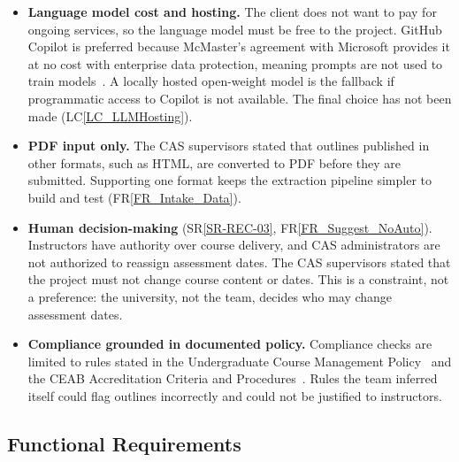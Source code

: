 \documentclass[12pt]{article}
\newcommand{\srref}[1]{SR\ref{#1}}
\newcommand{\rref}[1]{FR\ref{#1}}
\newcommand{\lcref}[1]{LC\ref{#1}}
\begin{document}
\begin{itemize}
\item \textbf{Language model cost and hosting.} The client does not want to pay
  for ongoing services, so the language model must be free to the project.
  GitHub Copilot is preferred because McMaster's agreement with Microsoft
  provides it at no cost with enterprise data protection, meaning prompts are
  not used to train models~\citep{McMasterCopilot}. A locally hosted open-weight model is the fallback
  if programmatic access to Copilot is not available. The final choice has not
  been made (\lcref{LC_LLMHosting}).

\item \textbf{PDF input only.} The CAS supervisors stated that outlines
  published in other formats, such as HTML, are converted to PDF before they
  are submitted. Supporting one format keeps the extraction pipeline simpler
  to build and test (\rref{FR_Intake_Data}).

\item \textbf{Human decision-making} (\srref{SR-REC-03},
  \rref{FR_Suggest_NoAuto}). Instructors have authority over course delivery,
  and CAS administrators are not authorized to reassign assessment dates. The
  CAS supervisors stated that the project must not change course content or
  dates. This is a constraint, not a preference: the university, not the team,
  decides who may change assessment dates.

\item \textbf{Compliance grounded in documented policy.} Compliance checks are
  limited to rules stated in the Undergraduate Course Management
  Policy~\citep{McMasterUCMP2025} and the CEAB Accreditation Criteria and
  Procedures~\citep{CEAB2025}.
  Rules the team inferred itself could flag outlines incorrectly and could not
  be justified to instructors.
\end{itemize}

\subsection{Functional Requirements}
\end{document}
